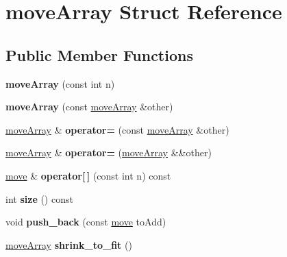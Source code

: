 \hypertarget{structmoveArray}{}\section{move\+Array Struct Reference}
\label{structmoveArray}
\subsection*{Public Member Functions}
\begin{DoxyCompactItemize}
\item 
\mbox{\label{structmoveArray_a3cb7e6bc3daac07f3005e7ca18af4589}} 
{\bfseries move\+Array} (const int n)
\item 
\mbox{\label{structmoveArray_a78117ae0946c2a61ff86a832c420c854}} 
{\bfseries move\+Array} (const \hyperlink{structmoveArray}{move\+Array} \&other)
\item 
\mbox{\label{structmoveArray_ad7c5f1a65aab09aebbd565bb9cb4e75a}} 
\hyperlink{structmoveArray}{move\+Array} \& {\bfseries operator=} (const \hyperlink{structmoveArray}{move\+Array} \&other)
\item 
\mbox{\label{structmoveArray_ac52807be18bc0ed75496b11cedacb95c}} 
\hyperlink{structmoveArray}{move\+Array} \& {\bfseries operator=} (\hyperlink{structmoveArray}{move\+Array} \&\&other)
\item 
\mbox{\label{structmoveArray_a87f555217ae65d2cb0c3c86ea24685ba}} 
\hyperlink{structmove}{move} \& {\bfseries operator\mbox{[}$\,$\mbox{]}} (const int n) const
\item 
\mbox{\label{structmoveArray_a51d7076907d805b0ba70a70f73e3bf65}} 
int {\bfseries size} () const
\item 
\mbox{\label{structmoveArray_affee3c505faa6dc63cede89334cbfc7d}} 
void {\bfseries push\+\_\+back} (const \hyperlink{structmove}{move} to\+Add)
\item 
\mbox{\label{structmoveArray_a698865395b51d324daa961adb18eb398}} 
\hyperlink{structmoveArray}{move\+Array} {\bfseries shrink\+\_\+to\+\_\+fit} ()
\end{DoxyCompactItemize}
